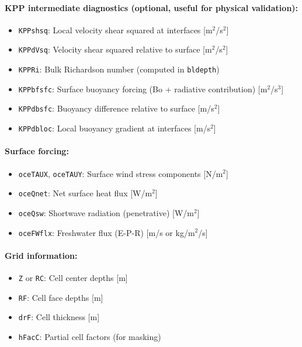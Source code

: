 \documentclass[11pt, a4paper]{article}
\begin{document}
\paragraph{KPP intermediate diagnostics (optional, useful for physical validation):}
\begin{itemize}
    \item \texttt{KPPshsq}: Local velocity shear squared at interfaces [m$^2$/s$^2$]
    \item \texttt{KPPdVsq}: Velocity shear squared relative to surface [m$^2$/s$^2$]
    \item \texttt{KPPRi}: Bulk Richardson number (computed in \texttt{bldepth})
    \item \texttt{KPPbfsfc}: Surface buoyancy forcing (Bo + radiative contribution) [m$^2$/s$^3$]
    \item \texttt{KPPdbsfc}: Buoyancy difference relative to surface [m/s$^2$]
    \item \texttt{KPPdbloc}: Local buoyancy gradient at interfaces [m/s$^2$]
\end{itemize}

\paragraph{Surface forcing:}
\begin{itemize}
    \item \texttt{oceTAUX}, \texttt{oceTAUY}: Surface wind stress components [N/m$^2$]
    \item \texttt{oceQnet}: Net surface heat flux [W/m$^2$]
    \item \texttt{oceQsw}: Shortwave radiation (penetrative) [W/m$^2$]
    \item \texttt{oceFWflx}: Freshwater flux (E-P-R) [m/s or kg/m$^2$/s]
\end{itemize}

\paragraph{Grid information:}
\begin{itemize}
    \item \texttt{Z} or \texttt{RC}: Cell center depths [m]
    \item \texttt{RF}: Cell face depths [m]
    \item \texttt{drF}: Cell thickness [m]
    \item \texttt{hFacC}: Partial cell factors (for masking)
\end{itemize}
\end{document}
